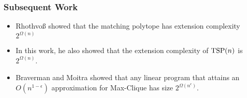 
\begin{frame}
\frametitle{Subsequent Work}

\begin{itemize}
\item<1-> Rhothvo{\ss} showed that the matching polytope has extension complexity $2^{\Omega(n)}$
\item<2-> In this work, he also showed that the extension complexity of $\operatorname{TSP}(n)$ is $2^{\Omega(n)}$.
\item<3-> Braverman and Moitra showed that any linear program that attains an $O(n^{1-\epsilon})$ approximation for Max-Clique has size $2^{\Omega(n^\epsilon)}$.
\end{itemize}
\end{frame}





